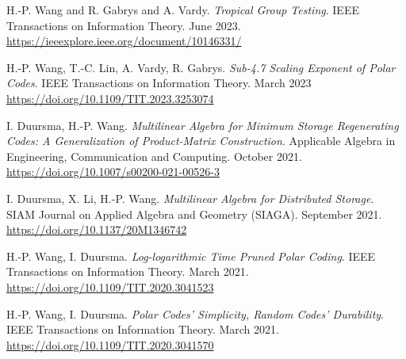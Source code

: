 \documentclass{article}
\begin{document}
\bgroup
\def\section#1#2{}
\begin{thebibliography}{9}
    \bibitem{}
    H.-P. Wang and R. Gabrys and A. Vardy.
    \emph{Tropical Group Testing}.
    IEEE Transactions on Information Theory.
    June 2023.
    \url{https://ieeexplore.ieee.org/document/10146331/}

    \bibitem{}
    H.-P. Wang, T.-C. Lin, A. Vardy, R. Gabrys.
    \emph{Sub-4.7 Scaling Exponent of Polar Codes}.
    IEEE Transactions on Information Theory.
    March 2023
    \url{https://doi.org/10.1109/TIT.2023.3253074}

    \bibitem{}
    I. Duursma, H.-P. Wang.
    \emph{Multilinear Algebra for Minimum Storage Regenerating Codes:
        A Generalization of Product-Matrix Construction}.
    Applicable Algebra in Engineering, Communication and Computing.
    October 2021.
    \url{https://doi.org/10.1007/s00200-021-00526-3}

    \bibitem{}
    I. Duursma, X. Li, H.-P. Wang.
    \emph{Multilinear Algebra for Distributed Storage}.
    SIAM Journal on Applied Algebra and Geometry (SIAGA).
    September 2021.
    \url{https://doi.org/10.1137/20M1346742}

    \bibitem{}
    H.-P. Wang, I. Duursma.
    \emph{Log-logarithmic Time Pruned Polar Coding}.
    IEEE Transactions on Information Theory.
    March 2021.
    \url{https://doi.org/10.1109/TIT.2020.3041523}

    \bibitem{}
    H.-P. Wang, I. Duursma.
    \emph{Polar Codes' Simplicity, Random Codes' Durability}.
    IEEE Transactions on Information Theory.
    March 2021.
    \url{https://doi.org/10.1109/TIT.2020.3041570}
\end{thebibliography}
\end{document}
